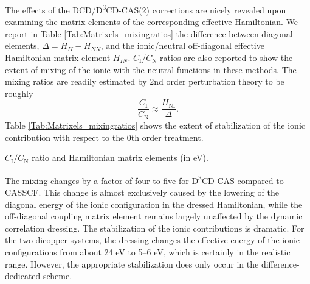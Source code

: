 The effects of the DCD/D\textsuperscript{3}CD-CAS(2) corrections are nicely revealed upon examining the matrix elements of the corresponding effective Hamiltonian. We report in Table \ref{Tab:Matrixels_mixingratios} the difference between diagonal elements, $\Delta  = H_{II}^{} - H_{NN}$, and the ionic/neutral off-diagonal effective Hamiltonian matrix element $H_{IN}$. ${C_\text{I}}/{C_\text{N}}$ ratios are also reported to show the extent of mixing of the ionic with the neutral functions in these methods. The mixing ratios are readily estimated by 2nd order perturbation theory to be roughly 
\begin{equation}
\frac{{C_\text{I}}}{{C_\text{N}}} \approx  \frac{H_\text{NI}}{\Delta}.
\end{equation}
Table \ref{Tab:Matrixels_mixingratios} shows the extent of stabilization of the ionic contribution with respect to the 0th order treatment.
\begin{table}
\small
\centering
\ttabbox
{\caption[$C_\text{I}/C_\text{N}$ ratio and Hamiltonian matrix elements.]{$C_\text{I}/C_\text{N}$ ratio and Hamiltonian matrix elements (in eV).}
\label{Tab:Matrixels_mixingratios}}
{}
\end{table}
The mixing changes by a factor of four to five for D\textsuperscript{3}CD-CAS compared to CASSCF. This change is almost exclusively caused by the lowering of the diagonal energy of the ionic configuration in the dressed Hamiltonian, while the off-diagonal coupling matrix element remains largely unaffected by the dynamic correlation dressing. The stabilization of the ionic contributions is dramatic. For the two dicopper systems, the dressing changes the effective energy of the ionic configurations from about 24 eV to 5--6 eV, which is certainly in the realistic range.\cite{CalzaCMC_2002_3985} However, the appropriate stabilization does only occur in the difference-dedicated scheme.
